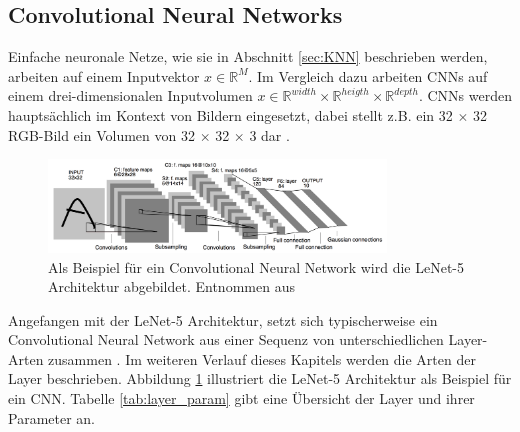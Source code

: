 \pagebreak

\subsection{Convolutional Neural Networks}
\label{sec:CNN}
Einfache neuronale Netze, wie sie in Abschnitt \ref{sec:KNN} beschrieben werden, arbeiten auf einem Inputvektor $x \in \mathbb{R}^{M}$. Im Vergleich dazu arbeiten CNNs auf einem drei-dimensionalen Inputvolumen $x \in \mathbb{R}^{width} \times \mathbb{R}^{heigth} \times \mathbb{R}^{depth}$. CNNs werden hauptsächlich im Kontext von Bildern eingesetzt, dabei stellt z.B. ein 32 $\times$ 32 RGB-Bild ein Volumen von 32 $\times$ 32 $\times$ 3 dar \cite{CS231nConvolutionalNeurala}.

\begin{figure}[t]
	\centering
	\includegraphics[width=0.8\textwidth]{images/ann_conv/lenet5.png}
	\caption{Als Beispiel für ein Convolutional Neural Network wird die LeNet-5 Architektur abgebildet. Entnommen aus \cite{lecunGradientBasedLearningApplied1998}  }
	\label{fig:lenet5}
\end{figure}


Angefangen mit der LeNet-5 \cite{lecunGradientBasedLearningApplied1998} Architektur, setzt sich typischerweise ein Convolutional Neural Network aus einer Sequenz von unterschiedlichen Layer-Arten zusammen \cite{szegedyGoingDeeperConvolutions2015, CS231nConvolutionalNeurala}. Im weiteren Verlauf dieses Kapitels werden die Arten der Layer beschrieben. Abbildung \ref{fig:lenet5} illustriert die LeNet-5 Architektur als Beispiel für ein CNN. Tabelle \ref{tab:layer_param} gibt eine Übersicht der Layer und ihrer Parameter an.

